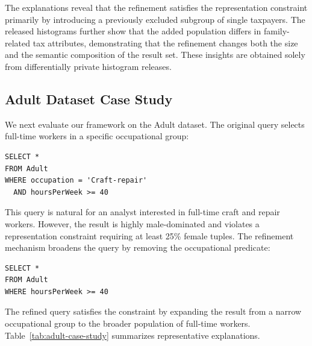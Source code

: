 The explanations reveal that the refinement satisfies the representation
constraint primarily by introducing a previously excluded subgroup of
single taxpayers. The released histograms further show that the added
population differs in family-related tax attributes, demonstrating that
the refinement changes both the size and the semantic composition of the
result set. These insights are obtained solely from differentially private
histogram releases.

\subsection{Adult Dataset Case Study}

We next evaluate our framework on the Adult dataset. The original query
selects full-time workers in a specific occupational group:

\begin{verbatim}
SELECT *
FROM Adult
WHERE occupation = 'Craft-repair'
  AND hoursPerWeek >= 40
\end{verbatim}

This query is natural for an analyst interested in full-time craft and
repair workers. However, the result is highly male-dominated and violates
a representation constraint requiring at least 25\% female tuples. The
refinement mechanism broadens the query by removing the occupational
predicate:

\begin{verbatim}
SELECT *
FROM Adult
WHERE hoursPerWeek >= 40
\end{verbatim}

The refined query satisfies the constraint by expanding the result from a
narrow occupational group to the broader population of full-time workers.
Table~\ref{tab:adult-case-study} summarizes representative explanations.

